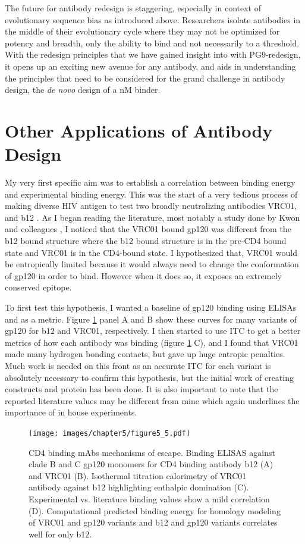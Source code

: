 The future for antibody redesign is staggering, especially in context of evolutionary sequence bias as introduced above. Researchers isolate antibodies in the middle of their evolutionary cycle where they may not be optimized for potency and breadth, only the ability to bind and not necessarily to a threshold. With the redesign principles that we have gained insight into with PG9-redesign, it opens up an exciting new avenue for any antibody, and aids in understanding the principles that need to be considered for the grand challenge in antibody design, the \textit{de novo} design of a nM binder.

\section{Other Applications of Antibody Design}
My very first specific aim was to establish a correlation between \silico binding energy and experimental binding energy. This was the start of a very tedious process of making diverse HIV antigen to test two broadly neutralizing antibodies VRC01, and b12 \citep{Wu:2009ks,Li:2011ea}. As I began reading the literature, most notably a study done by Kwon and colleagues \citep{Kwon:2012eo}, I noticed that the VRC01 bound gp120 was different from the b12 bound structure where the b12 bound structure is in the pre-CD4 bound state and VRC01 is in the CD4-bound state. I hypothesized that, VRC01 would be entropically limited because it would always need to change the conformation of gp120 in order to bind. However when it does so, it exposes an extremely conserved epitope.

To first test this hypothesis, I wanted a baseline of gp120 binding using ELISAs and \ec as a metric. Figure \ref{fig:fig5_5} panel A and B show these curves for many variants of gp120 for b12 and VRC01, respectively. I then started to use ITC to get a better metrics of how each antibody was binding (figure \ref{fig:fig5_5} C), and I found that VRC01 made many hydrogen bonding contacts, but gave up huge entropic penalties. Much work is needed on this front as an accurate ITC for each variant is absolutely necessary to confirm this hypothesis, but the initial work of creating constructs and protein has been done. It is also important to note that the reported literature values may be different from mine which again underlines the importance of in house experiments.

\begin{figure}[!t]
   \centering
   \texttt{[image: images/chapter5/figure5\_5.pdf]}
   \caption[CD4 Binding mAbs Mechanisms of Escape]{CD4 binding mAbs mechanisms of escape. Binding ELISAS against clade B and C gp120 monomers for CD4 binding antibody b12 (A) and VRC01 (B). Isothermal titration calorimetry of VRC01 antibody against b12 highlighting enthalpic domination (C). Experimental vs. literature binding values show a mild correlation (D). Computational predicted binding energy for homology modeling of VRC01 and gp120 variants and b12 and gp120 variants correlates well for only b12.}
    \label{fig:fig5_5}
\end{figure}

